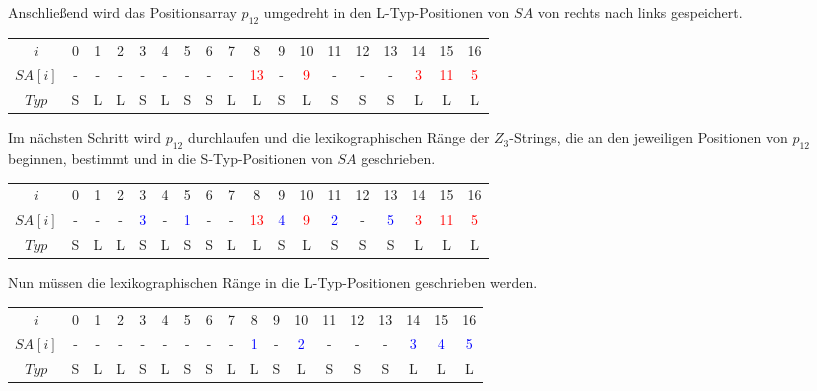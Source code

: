 Anschließend wird das Positionsarray $p_{12}$ umgedreht in den L-Typ-Positionen von $SA$ von rechts nach links gespeichert.

\begin{table}[H]
	\centering
	\begin{tabular}{c| c c c c c c c c c c c c c c c c c}
		$i$ & 0 & 1 & 2 & 3 & 4 & 5 & 6 & 7 & 8 & 9 & 10 & 11 & 12 & 13 & 14 & 15 & 16 \\
		$SA[i]$ & - & - & - & - & - & - & - & - & \textcolor{red}{13} & - & \textcolor{red}{9} & - & - & - & \textcolor{red}{3} & \textcolor{red}{11} & \textcolor{red}{5} \\
		$Typ$ & S & L & L & S & L & S & S & L & L & S & L & S & S & S & L & L & L
	\end{tabular}
\end{table}

Im nächsten Schritt wird $p_{12}$ durchlaufen und die lexikographischen Ränge der $Z_3$-Strings, die an den jeweiligen Positionen von $p_{12}$ beginnen, bestimmt und in die S-Typ-Positionen von $SA$ geschrieben.

\begin{table}[H]
	\centering
	\begin{tabular}{c| c c c c c c c c c c c c c c c c c}
		$i$ & 0 & 1 & 2 & 3 & 4 & 5 & 6 & 7 & 8 & 9 & 10 & 11 & 12 & 13 & 14 & 15 & 16 \\
		$SA[i]$ & - & - & - & \textcolor{blue}{3} & - & \textcolor{blue}{1} & - & - & \textcolor{red}{13} & \textcolor{blue}{4} & \textcolor{red}{9} & \textcolor{blue}{2} & - & \textcolor{blue}{5} & \textcolor{red}{3} & \textcolor{red}{11} & \textcolor{red}{5} \\
		$Typ$ & S & L & L & S & L & S & S & L & L & S & L & S & S & S & L & L & L
	\end{tabular}
\end{table}

Nun müssen die lexikographischen Ränge in die L-Typ-Positionen geschrieben werden.

\begin{table}[H]
	\centering
	\begin{tabular}{c| c c c c c c c c c c c c c c c c c}
		$i$ & 0 & 1 & 2 & 3 & 4 & 5 & 6 & 7 & 8 & 9 & 10 & 11 & 12 & 13 & 14 & 15 & 16 \\
		$SA[i]$ & - & - & - & - & - & - & - & - & \textcolor{blue}{1} & - & \textcolor{blue}{2} & - & - & - & \textcolor{blue}{3} & \textcolor{blue}{4} & \textcolor{blue}{5} \\
		$Typ$ & S & L & L & S & L & S & S & L & L & S & L & S & S & S & L & L & L
	\end{tabular}
\end{table}

